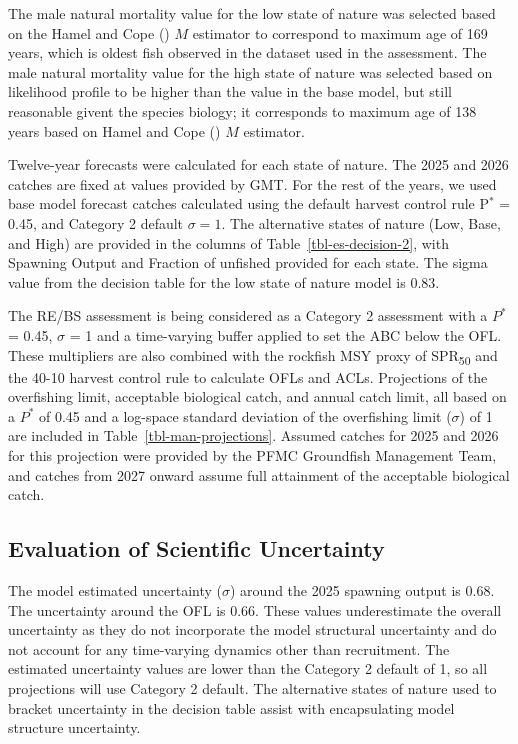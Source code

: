 \documentclass[
  english,
]{article}
\begin{document}
The male natural mortality value for the low state of nature was
selected based on the Hamel and Cope
() \(M\) estimator to
correspond to maximum age of 169 years, which is oldest fish observed in
the dataset used in the assessment. The male natural mortality value for
the high state of nature was selected based on likelihood profile to be
higher than the value in the base model, but still reasonable givent the
species biology; it corresponds to maximum age of 138 years based on
Hamel and Cope () \(M\)
estimator.

Twelve-year forecasts were calculated for each state of nature. The 2025
and 2026 catches are fixed at values provided by GMT. For the rest of
the years, we used base model forecast catches calculated using the
default harvest control rule P\(^*\) = 0.45, and Category 2 default
\(\sigma = 1\). The alternative states of nature (Low, Base, and High)
are provided in the columns of Table~\ref{tbl-es-decision-2}, with
Spawning Output and Fraction of unfished provided for each state. The
sigma value from the decision table for the low state of nature model is
0.83.

The RE/BS assessment is being considered as a Category 2 assessment with
a \(P^*\) = 0.45, \(\sigma\) = 1 and a time-varying buffer applied to
set the ABC below the OFL. These multipliers are also combined with the
rockfish MSY proxy of SPR\textsubscript{50} and the 40-10 harvest
control rule to calculate OFLs and ACLs. Projections of the overfishing
limit, acceptable biological catch, and annual catch limit, all based on
a \(P^*\) of 0.45 and a log-space standard deviation of the overfishing
limit (\(\sigma\)) of 1 are included in Table~\ref{tbl-man-projections}.
Assumed catches for 2025 and 2026 for this projection were provided by
the PFMC Groundfish Management Team, and catches from 2027 onward assume
full attainment of the acceptable biological catch.

\subsection{Evaluation of Scientific Uncertainty}\label{sec-uncertainty}

The model estimated uncertainty (\(\sigma\)) around the 2025 spawning
output is 0.68. The uncertainty around the OFL is 0.66. These values
underestimate the overall uncertainty as they do not incorporate the
model structural uncertainty and do not account for any time-varying
dynamics other than recruitment. The estimated uncertainty values are
lower than the Category 2 default of 1, so all projections will use
Category 2 default. The alternative states of nature used to bracket
uncertainty in the decision table assist with encapsulating model
structure uncertainty.
\end{document}
